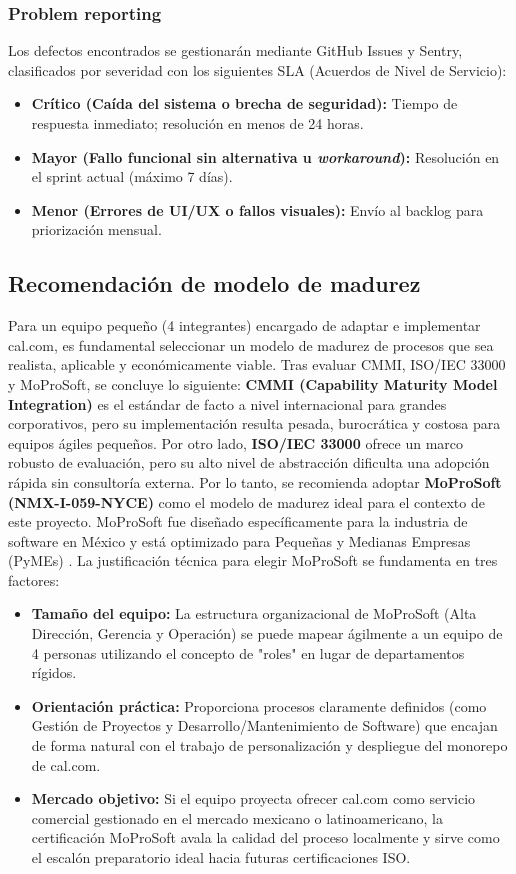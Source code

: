 \documentclass[12pt, a4paper]{article}
\begin{document}
\subsubsection*{Problem reporting}
Los defectos encontrados se gestionarán mediante GitHub Issues y Sentry, clasificados por severidad con los siguientes SLA (Acuerdos de Nivel de Servicio):
\begin{itemize}
    \item \textbf{Crítico (Caída del sistema o brecha de seguridad):} Tiempo de respuesta inmediato; resolución en menos de 24 horas.
    \item \textbf{Mayor (Fallo funcional sin alternativa u \textit{workaround}):} Resolución en el sprint actual (máximo 7 días).
    \item \textbf{Menor (Errores de UI/UX o fallos visuales):} Envío al backlog para priorización mensual.
\end{itemize}

\subsection{Recomendación de modelo de madurez}
Para un equipo pequeño (4 integrantes) encargado de adaptar e implementar cal.com, es fundamental seleccionar un modelo de madurez de procesos que sea realista, aplicable y económicamente viable. Tras evaluar CMMI, ISO/IEC 33000 y MoProSoft, se concluye lo siguiente:
\textbf{CMMI (Capability Maturity Model Integration)} es el estándar de facto a nivel internacional para grandes corporativos, pero su implementación resulta pesada, burocrática y costosa para equipos ágiles pequeños. Por otro lado, \textbf{ISO/IEC 33000} ofrece un marco robusto de evaluación, pero su alto nivel de abstracción dificulta una adopción rápida sin consultoría externa.
Por lo tanto, se recomienda adoptar \textbf{MoProSoft (NMX-I-059-NYCE)} como el modelo de madurez ideal para el contexto de este proyecto. MoProSoft fue diseñado específicamente para la industria de software en México y está optimizado para Pequeñas y Medianas Empresas (PyMEs) \parencite{oktaba2008}.
La justificación técnica para elegir MoProSoft se fundamenta en tres factores:
\begin{itemize}
\item \textbf{Tamaño del equipo:} La estructura organizacional de MoProSoft (Alta Dirección, Gerencia y Operación) se puede mapear ágilmente a un equipo de 4 personas utilizando el concepto de "roles" en lugar de departamentos rígidos.
\item \textbf{Orientación práctica:} Proporciona procesos claramente definidos (como Gestión de Proyectos y Desarrollo/Mantenimiento de Software) que encajan de forma natural con el trabajo de personalización y despliegue del monorepo de cal.com.
\item \textbf{Mercado objetivo:} Si el equipo proyecta ofrecer cal.com como servicio comercial gestionado en el mercado mexicano o latinoamericano, la certificación MoProSoft avala la calidad del proceso localmente y sirve como el escalón preparatorio ideal hacia futuras certificaciones ISO.
\end{itemize}
\end{document}
